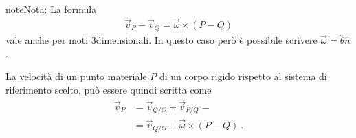 \documentclass[letterpaper,10pt,italian]{jupyterBook}
\begin{document}
\begin{sphinxadmonition}{note}{Nota:}
\sphinxAtStartPar
La formula
\begin{equation*}
\begin{split}\vec{v}_P - \vec{v}_Q = \vec{\omega} \times (P - Q)\end{split}
\end{equation*}
\sphinxAtStartPar
vale anche per moti 3\sphinxhyphen{}dimensionali. In questo caso però  è possibile scrivere \(\vec{\omega} = \dot{\theta} \hat{n}\).
\end{sphinxadmonition}

\sphinxAtStartPar
La velocità di un punto materiale \(P\) di un corpo rigido rispetto al sistema di riferimento scelto, può essere quindi scritta come
\begin{equation*}
\begin{split}\begin{aligned}
    \vec{v}_P & = \vec{v}_{Q/O} + \vec{v}_{P/Q} = \\
              & = \vec{v}_{Q/O} + \vec{\omega} \times (P - Q) \ .
  \end{aligned}\end{split}
\end{equation*}
\end{document}
